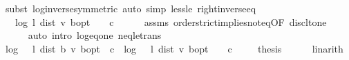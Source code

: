 \begin{isabellebody}
\ {\isacharparenleft}{\kern0pt}subst\ log{\isacharunderscore}{\kern0pt}inverse{\isacharbrackleft}{\kern0pt}symmetric{\isacharbrackright}{\kern0pt}{\isacharparenright}{\kern0pt}\ {\isacharparenleft}{\kern0pt}auto\ simp{\isacharcolon}{\kern0pt}\ less{\isacharunderscore}{\kern0pt}le\ right{\isacharunderscore}{\kern0pt}inverse{\isacharunderscore}{\kern0pt}eq{\isacharparenright}{\kern0pt}\isanewline
\ \ \isamarkupfalse%
\ \isamarkupfalse%
\ {\isachardoublequoteopen}{\isasymdots}\ {\isacharequal}{\kern0pt}\ {\isacharparenleft}{\kern0pt}log\ {\isacharparenleft}{\kern0pt}{}{\isacharslash}{\kern0pt}l{\isacharparenright}{\kern0pt}\ {\isacharparenleft}{\kern0pt}dist\ v\ {\isasymnu}\isactrlsub b{\isacharunderscore}{\kern0pt}opt{\isacharparenright}{\kern0pt}{\isacharparenright}{\kern0pt}\ {\isacharminus}{\kern0pt}\ {}\ {\isacharminus}{\kern0pt}\ c{\isachardoublequoteclose}\isanewline
\ \ \ \ \isamarkupfalse%
\ assms\ order{\isachardot}{\kern0pt}strict{\isacharunderscore}{\kern0pt}implies{\isacharunderscore}{\kern0pt}not{\isacharunderscore}{\kern0pt}eq{\isacharbrackleft}{\kern0pt}OF\ disc{\isacharunderscore}{\kern0pt}lt{\isacharunderscore}{\kern0pt}one{\isacharbrackright}{\kern0pt}\isanewline
\ \ \ \ \isamarkupfalse%
\ {\isacharparenleft}{\kern0pt}auto\ intro{\isacharbang}{\kern0pt}{\isacharcolon}{\kern0pt}\ log{\isacharunderscore}{\kern0pt}eq{\isacharunderscore}{\kern0pt}one\ neq{\isacharunderscore}{\kern0pt}le{\isacharunderscore}{\kern0pt}trans{\isacharparenright}{\kern0pt}\isanewline
\ \ \isamarkupfalse%
\ \isamarkupfalse%
\ {\isachardoublequoteopen}log\ {\isacharparenleft}{\kern0pt}{}\ {\isacharslash}{\kern0pt}\ l{\isacharparenright}{\kern0pt}\ {\isacharparenleft}{\kern0pt}dist\ {\isacharparenleft}{\kern0pt}{\isasymL}\isactrlsub b\ v{\isacharparenright}{\kern0pt}\ {\isasymnu}\isactrlsub b{\isacharunderscore}{\kern0pt}opt{\isacharparenright}{\kern0pt}\ {\isacharminus}{\kern0pt}\ c\ {\isasymle}\ log\ {\isacharparenleft}{\kern0pt}{}\ {\isacharslash}{\kern0pt}\ l{\isacharparenright}{\kern0pt}\ {\isacharparenleft}{\kern0pt}dist\ v\ {\isasymnu}\isactrlsub b{\isacharunderscore}{\kern0pt}opt{\isacharparenright}{\kern0pt}\ {\isacharminus}{\kern0pt}\ {}\ {\isacharminus}{\kern0pt}\ c{\isachardoublequoteclose}\ \isacommand{{\isachardot}{\kern0pt}}\isamarkupfalse%
\isanewline
\ \ \isamarkupfalse%
\ {\isacharquery}{\kern0pt}thesis\isanewline
\ \ \ \ \isamarkupfalse%
\ linarith\isanewline

\end{isabellebody}

